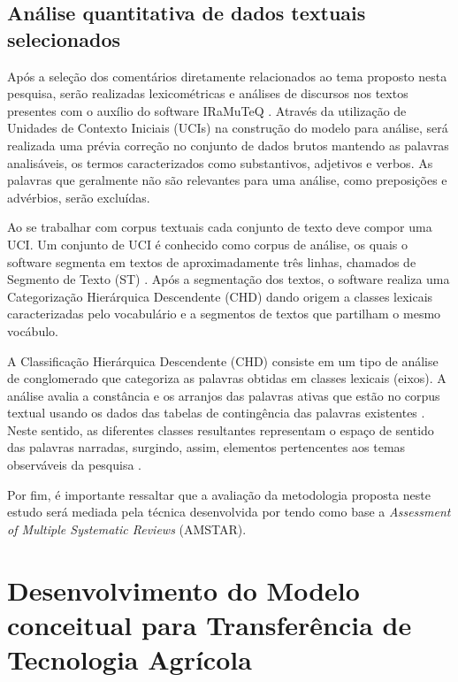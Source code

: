 \subsection{Análise quantitativa de dados textuais selecionados}

Após a seleção dos comentários diretamente relacionados ao tema proposto nesta pesquisa, serão realizadas lexicométricas e análises de discursos nos textos presentes com o auxílio do software IRaMuTeQ \cite{conde_lexicometria_2015,da_silva_cezar_panorama_2018}. Através da utilização de Unidades de Contexto Iniciais (UCIs) na construção do modelo para análise, será realizada uma prévia correção no conjunto de dados brutos mantendo as palavras analisáveis, os termos caracterizados como substantivos, adjetivos e verbos. As palavras que geralmente não são relevantes para uma análise, como preposições e advérbios, serão excluídas.

Ao se trabalhar com corpus textuais cada conjunto de texto deve compor uma UCI. Um conjunto de UCI é conhecido como corpus de análise, os quais o software segmenta em textos de aproximadamente três linhas, chamados de Segmento de Texto (ST) \cite{fernandes_avaliacao_2018}. Após a segmentação dos textos, o software realiza uma Categorização Hierárquica Descendente (CHD) dando origem a classes lexicais caracterizadas pelo vocabulário e a segmentos de textos que partilham o mesmo vocábulo.

A Classificação Hierárquica Descendente (CHD) consiste em um tipo de análise de conglomerado que categoriza as palavras obtidas em classes lexicais (eixos). A análise avalia a constância e os arranjos das palavras ativas que estão no corpus textual usando os dados das tabelas de contingência das palavras existentes \cite{carvalho_utilizacao_2020,mendes_mapping_2019}. Neste sentido, as diferentes classes resultantes representam o espaço de sentido das palavras narradas, surgindo, assim, elementos pertencentes aos temas observáveis da pesquisa \cite{gavasso_revisao_2016}. 

Por fim, é importante ressaltar que a avaliação da metodologia proposta neste estudo será mediada pela técnica desenvolvida por  tendo como base a \textit{Assessment of Multiple Systematic Reviews} (AMSTAR).


\section{Desenvolvimento do Modelo conceitual para Transferência de Tecnologia Agrícola}

